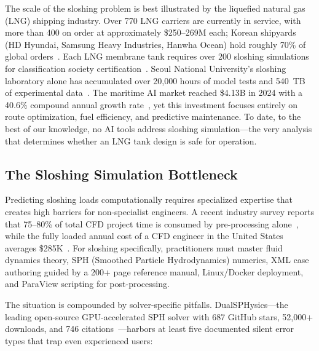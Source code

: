 \documentclass[11pt]{article}
\begin{document}
The scale of the sloshing problem is best illustrated by the liquefied natural gas (LNG) shipping industry. Over 770 LNG carriers are currently in service, with more than 400 on order at approximately \$250--269M each; Korean shipyards (HD Hyundai, Samsung Heavy Industries, Hanwha Ocean) hold roughly 70\% of global orders~\citep{lloyd2024}. Each LNG membrane tank requires over 200 sloshing simulations for classification society certification~\citep{sjtu_ofw13_2018}. Seoul National University's sloshing laboratory alone has accumulated over 20,000 hours of model tests and 540~TB of experimental data~\citep{kim2019sloshing}. The maritime AI market reached \$4.13B in 2024 with a 40.6\% compound annual growth rate~\citep{marketreport2024}, yet this investment focuses entirely on route optimization, fuel efficiency, and predictive maintenance. To date, to the best of our knowledge, no AI tools address sloshing simulation---the very analysis that determines whether an LNG tank design is safe for operation.

\subsection{The Sloshing Simulation Bottleneck}

Predicting sloshing loads computationally requires specialized expertise that creates high barriers for non-specialist engineers. A recent industry survey reports that 75--80\% of total CFD project time is consumed by pre-processing alone~\citep{cadence2024}, while the fully loaded annual cost of a CFD engineer in the United States averages \$285K~\citep{resolved_analytics}. For sloshing specifically, practitioners must master fluid dynamics theory, SPH (Smoothed Particle Hydrodynamics) numerics, XML case authoring guided by a 200+ page reference manual, Linux/Docker deployment, and ParaView scripting for post-processing.

The situation is compounded by solver-specific pitfalls. DualSPHysics---the leading open-source GPU-accelerated SPH solver with 687 GitHub stars, 52,000+ downloads, and 746 citations~\citep{dominguez2022dualsphysics}---harbors at least five documented silent error types that trap even experienced users:
\end{document}
